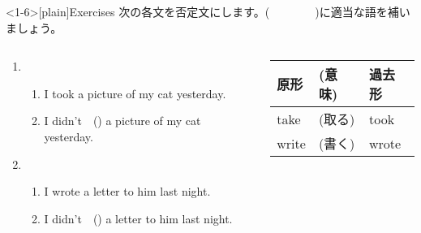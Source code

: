 \documentclass[aspectratio=169,xcolor={dvipsnames,table}]{beamer}
\newcommand{\myaudio}[1]{\href{#1}{\faVolumeUp}}
\begin{document}
\begin{frame}<1-6>[plain]{Exercises}
 次の各文を否定文にします。(~~~~~~~~)に適当な語を補いましょう。

\begin{columns}
\begin{column}{.6\textwidth}
\begin{enumerate}
 \item \begin{enumerate}
	\item I took a picture of my cat yesterday.
	\item I didn't~~() a picture of my cat yesterday.
       \end{enumerate}
 \item \begin{enumerate}
	\item I wrote a letter to him last night.
	\item I didn't~~() a letter to him last night.
       \end{enumerate}
\end{enumerate}
\end{column}
\begin{column}{.35\textwidth}
{
\begin{tabular}{lll}\toprule
{\small 原形}&{\small (意味)}&{\small 過去形}\\\midrule
{take}&{{\small (取る)}}&{took}\\
{write}&{{\small (書く)}}&{wrote}\\
\bottomrule
\end{tabular}}%

\end{column}
\end{columns}
\hfill\myaudio{./audio/026_past_didnot_08.mp3}

\end{frame}
\end{document}
